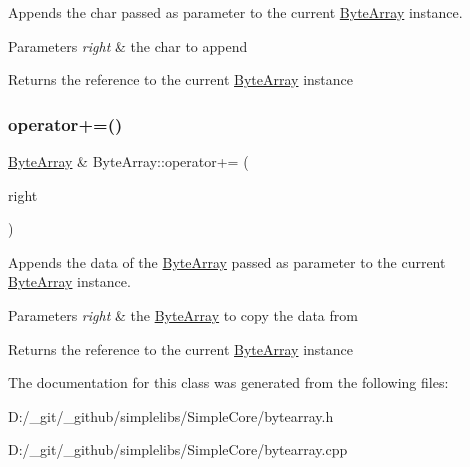 Appends the char passed as parameter to the current \mbox{\hyperlink{class_byte_array}{Byte\+Array}} instance. 


\begin{DoxyParams}{Parameters}
{\em right} & the char to append \\
\hline
\end{DoxyParams}
\begin{DoxyReturn}{Returns}
the reference to the current \mbox{\hyperlink{class_byte_array}{Byte\+Array}} instance 
\end{DoxyReturn}
\mbox{\label{class_byte_array_ab3635362b3abb48c398b38d91e37433b}} 
\subsubsection{\texorpdfstring{operator+=()}{operator+=()}\hspace{0.1cm}{\footnotesize\ttfamily [2/2]}}
{\footnotesize\ttfamily \mbox{\hyperlink{class_byte_array}{Byte\+Array}} \& Byte\+Array\+::operator+= (\begin{DoxyParamCaption}\item[{const \mbox{\hyperlink{class_byte_array}{Byte\+Array}} \&}]{right }\end{DoxyParamCaption})}



Appends the data of the \mbox{\hyperlink{class_byte_array}{Byte\+Array}} passed as parameter to the current \mbox{\hyperlink{class_byte_array}{Byte\+Array}} instance. 


\begin{DoxyParams}{Parameters}
{\em right} & the \mbox{\hyperlink{class_byte_array}{Byte\+Array}} to copy the data from \\
\hline
\end{DoxyParams}
\begin{DoxyReturn}{Returns}
the reference to the current \mbox{\hyperlink{class_byte_array}{Byte\+Array}} instance 
\end{DoxyReturn}


The documentation for this class was generated from the following files\+:\begin{DoxyCompactItemize}
\item 
D\+:/\+\_\+git/\+\_\+github/simplelibs/\+Simple\+Core/bytearray.\+h\item 
D\+:/\+\_\+git/\+\_\+github/simplelibs/\+Simple\+Core/bytearray.\+cpp\end{DoxyCompactItemize}
